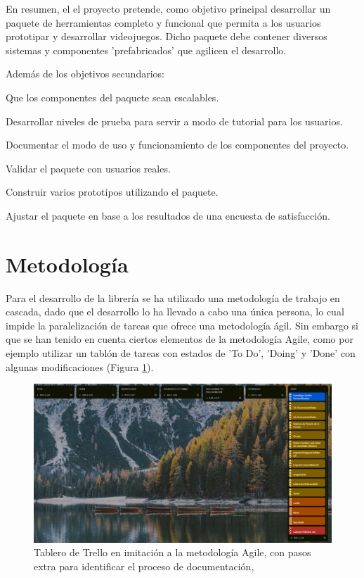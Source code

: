En resumen, el el proyecto pretende, como objetivo principal desarrollar un paquete de herramientas completo y funcional que permita a los usuarios prototipar y 
 desarrollar videojuegos. Dicho paquete debe contener diversos sistemas y componentes 'prefabricados' que agilicen el desarrollo. 

Además de los objetivos secundarios:
\begin{compactitem}
  \item Que los componentes del paquete sean escalables.
  \item Desarrollar niveles de prueba para servir a modo de tutorial para los usuarios.
  \item Documentar el modo de uso y funcionamiento de los componentes del proyecto.
  \item Validar el paquete con usuarios reales.
  \item Construir varios prototipos utilizando el paquete.
  \item Ajustar el paquete en base a los resultados de una encuesta de satisfacción.
\end{compactitem}

\section{Metodología}
Para el desarrollo de la librería se ha utilizado una metodología de trabajo en cascada, dado que el desarrollo lo ha llevado a cabo una única persona, lo cual
impide la paralelización de tareas que ofrece una metodología ágil. Sin embargo si que se han tenido en cuenta ciertos elementos de la metodología Agile, como 
por ejemplo utilizar un tablón de tareas con estados de 'To Do', 'Doing' y 'Done' con algunas modificaciones (Figura \ref{fig:trello}).

\begin{figure}[H]
  \centering
	\includegraphics[width=450px,clip=true]{trello2.png}
  \caption{Tablero de Trello en imitación a la metodología Agile, con pasos extra para identificar el proceso de documentación,}
  \label{fig:trello}
\end{figure}

